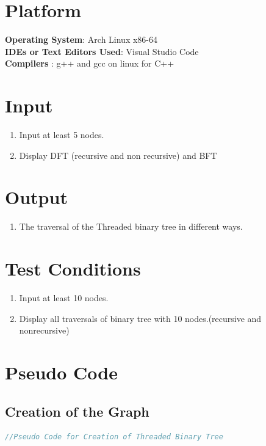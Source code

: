 \documentclass[11pt]{article}
\begin{document}


\section{Platform}
\textbf{\textbf{Operating System}}: Arch Linux x86-64 \\
\textbf{\textbf{IDEs or Text Editors Used}}: Visual Studio Code\\
\textbf{\textbf{Compilers} }: g++ and gcc on linux for C++\\

\section{Input}
\begin{enumerate}
    \item Input at least 5 nodes.
    \item Display DFT (recursive and non recursive) and BFT
\end{enumerate}

\section{Output}
\begin{enumerate}
    \item The traversal of the Threaded binary tree in different ways.
\end{enumerate}

\section{Test Conditions}
\begin{enumerate}
    \item Input at least 10 nodes.
    \item Display all traversals of binary tree with 10 nodes.(recursive and nonrecursive)
\end{enumerate}

\section{Pseudo Code}
\subsection{Creation of the Graph}
\begin{lstlisting}[language=C++]
	//Pseudo Code for Creation of Threaded Binary Tree

\end{lstlisting}
\end{document}
